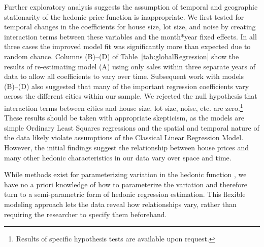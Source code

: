 \documentclass[leqno]{article}\usepackage[]{graphicx}\usepackage[]{color}
\begin{document}
Further exploratory analysis suggests the assumption of temporal and geographic stationarity of the hedonic price function is inappropriate. We first tested for temporal changes in the coefficients for house size, lot size, and noise by creating interaction terms between these variables and the month*year fixed effects. In all three cases the improved model fit was significantly more than expected due to random chance. Columns (B)--(D) of Table~\ref{tab:globalRegression} show the results of re-estimating model (A) using only sales within three separate years of data to allow all coefficients to vary over time. Subsequent work with models (B)--(D) also suggested that many of the important regression coefficients vary across the different cities within our sample. We rejected the null hypothesis that interaction terms between cities and house size, lot size, noise, etc. are zero.\footnote{Results of specific hypothesis tests are available upon request.}  These results should be taken with appropriate skepticism, as the models are simple Ordinary Least Squares regressions and the spatial and temporal nature of the data likely violate assumptions of the Classical Linear Regression Model. However, the initial findings suggest the relationship between house prices and many other hedonic characteristics in our data vary over space and time. 

While methods exist for parameterizing variation in the hedonic function \citep[such as spatial expansion as suggested by][]{Casetti1972}, we have no a priori knowledge of how to parameterize the variation and therefore turn to a semi-parametric form of hedonic regression estimation. This flexible modeling approach lets the data reveal how relationships vary, rather than requiring the researcher to specify them beforehand. 
\end{document}
